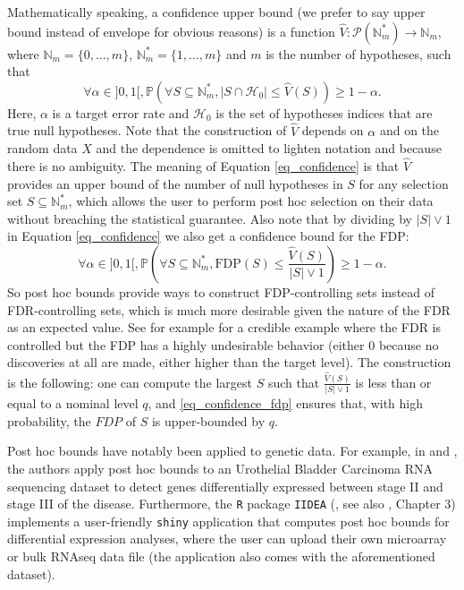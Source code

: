 \documentclass[
  11pt,
  a4paper,
]{article}
\theoremstyle{definition}
\theoremstyle{plain}
\theoremstyle{plain}
\theoremstyle{plain}
\theoremstyle{definition}
\theoremstyle{remark}
\begin{document}
Mathematically speaking, a confidence upper bound (we prefer to say
upper bound instead of envelope for obvious reasons) is a function
\(\widehat V: \mathcal{P}(\mathbb{N}_m^*) \to \mathbb{N}_m\), where
\(\mathbb{N}_m=\{0,\dotsc,m\}\), \(\mathbb{N}_m^*=\{1,\dotsc,m\}\) and
\(m\) is the number of hypotheses, such that \begin{equation}
\forall \alpha \in ]0,1[, \mathbb{P}\left(\forall S \subseteq \mathbb{N}_m^*, |S\cap \mathcal{H}_0|\leq \widehat V(S)\right)\geq 1-\alpha.
\label{eq_confidence}
\end{equation} Here, \(\alpha\) is a target error rate and
\(\mathcal{H}_0\) is the set of hypotheses indices that are true null
hypotheses. Note that the construction of \(\widehat V\) depends on
\(\alpha\) and on the random data \(X\) and the dependence is omitted to
lighten notation and because there is no ambiguity. The meaning of
Equation \eqref{eq_confidence} is that \(\widehat V\) provides an upper
bound of the number of null hypotheses in \(S\) for any selection set
\(S\subseteq \mathbb{N}_m^*\), which allows the user to perform post hoc
selection on their data without breaching the statistical guarantee.
Also note that by dividing by \(|S|\vee 1\) in Equation
\eqref{eq_confidence} we also get a confidence bound for the FDP:
\begin{equation}
\forall \alpha \in ]0,1[, \mathbb{P}\left(\forall S \subseteq \mathbb{N}_m^*, \mathrm{FDP}(S)\leq \frac{\widehat V(S)}{|S|\vee 1}\right)\geq 1-\alpha.
\label{eq_confidence_fdp}
\end{equation} So post hoc bounds provide ways to construct
FDP-controlling sets instead of FDR-controlling sets, which is much more
desirable given the nature of the FDR as an expected value. See for
example \citep[Figure 4]{MR3418717} for a credible example where the FDR
is controlled but the FDP has a highly undesirable behavior (either 0
because no discoveries at all are made, either higher than the target
level). The construction is the following: one can compute the largest
\(S\) such that \(\frac{\widehat V(S)}{|S|\vee 1}\) is less than or
equal to a nominal level \(q\), and \eqref{eq_confidence_fdp} ensures
that, with high probability, the \(FDP\) of \(S\) is upper-bounded by
\(q\).

Post hoc bounds have notably been applied to genetic data. For example,
in \citet{MR2951390} and \citet{10.1093/bioinformatics/btac693}, the
authors apply post hoc bounds to an Urothelial Bladder Carcinoma RNA
sequencing dataset to detect genes differentially expressed between
stage II and stage III of the disease. Furthermore, the \texttt{R}
\citep{R-base} package \texttt{IIDEA} (\citet{IIDEA}, see also
\citet{enjalbertcourrech:tel-05034928}, Chapter 3) implements a
user-friendly \texttt{shiny} application \citep{shiny} that computes
post hoc bounds for differential expression analyses, where the user can
upload their own microarray or bulk RNAseq data file (the application
also comes with the aforementioned dataset).
\end{document}
